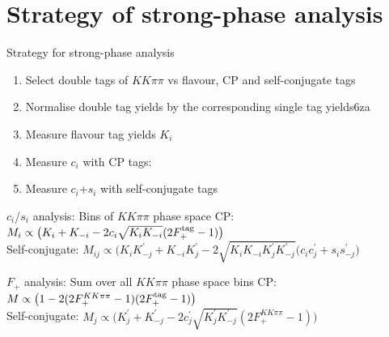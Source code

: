 \documentclass{beamer}
\begin{document}
\section{Strategy of strong-phase analysis}
\begin{frame}{Strategy for strong-phase analysis}
  \begin{enumerate}
    \setlength\itemsep{0.5em}
    \item{Select double tags of $KK\pi\pi$ vs flavour, CP and self-conjugate tags}
    \item{Normalise double tag yields by the corresponding single tag yields}6za
    \item{Measure flavour tag yields $K_i$}
    \item{Measure $c_i$ with CP tags:}
    \item{Measure $c_i$+$s_i$ with self-conjugate tags}
  \end{enumerate}
  \begin{block}{$c_i$/$s_i$ analysis: Bins of $KK\pi\pi$ phase space}
    CP: $M_i\propto\big(K_i + K_{-i} - 2c_i\sqrt{K_iK_{-i}}(2F_+^{\rm tag} - 1)\big)$ \\
    Self-conjugate: $M_{ij}\propto\big(K_iK_{-j}^\prime + K_{-i}K_j^\prime - 2\sqrt{K_iK_{-i}K_j^\prime K_{-j}^\prime}(c_ic_j^\prime + s_is_{-j}^\prime\big)$
  \end{block}
  \begin{block}{$F_+$ analysis: Sum over all $KK\pi\pi$ phase space bins}
    CP: $M\propto\big(1 - 2(2F_+^{KK\pi\pi} - 1)(2F_+^{\rm tag} - 1)\big)$ \\
    Self-conjugate: $M_j\propto\big(K_j^\prime + K_{-j}^\prime - 2c_j^{\prime}\sqrt{K_j^\prime K_{-j}^\prime}(2F_+^{KK\pi\pi} - 1)\big)$
  \end{block}
\end{frame}
\end{document}
